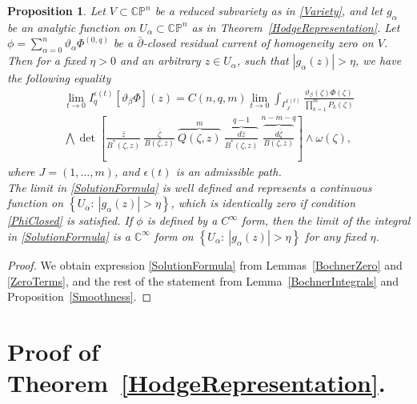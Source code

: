 \documentclass[11pt,reqno]{amsart}
\numberwithin{equation}{section}
\newtheorem{proposition}{Proposition}[section]
\begin{document}
\begin{proposition}\label{Solution} Let $V\subset {{\mathbb C}}{{\mathbb P}}^n$ be a reduced
subvariety as in \eqref{Variety}, and let $g_{\alpha}$ be an analytic function on
$U_{\alpha}\subset {{\mathbb C}}{{\mathbb P}}^n$ as in Theorem~\ref{HodgeRepresentation}. Let
$\phi=\sum_{\alpha=0}^n\vartheta_{\alpha}\Phi^{(0,q)}$
be a $\bar\partial$-closed residual current of homogeneity zero on $V$.\\
\indent
Then for a fixed $\eta>0$ and an arbitrary $z\in U_{\alpha}$,
such that $|g_{\alpha}(z)|>\eta$, we have the following equality
\begin{multline}\label{SolutionFormula}
\lim_{t\to 0}I_q^{\epsilon(t)}\left[\vartheta_{\beta}\Phi\right](z)
=C(n,q,m)\lim_{t\to 0}\int_{\Gamma^{\epsilon(t)}_J}
\frac{\vartheta_{\beta}(\zeta)\Phi(\zeta)}{\prod_{k=1}^mP_k(\zeta)}\\
\bigwedge\det\left[\frac{\bar z}{B^*(\zeta,z)}\ \frac{\bar\zeta}{B(\zeta,z)}\
\overbrace{Q(\zeta,z)}^{m}\
\overbrace{\frac{d{\bar z}}{B^*(\zeta,z)}}^{q-1}\
\overbrace{\frac{d{\bar\zeta}}{B(\zeta,z)}}^{n-m-q}\right]\wedge\omega(\zeta),
\end{multline}
where $J=(1,\dots,m)$, and $\epsilon(t)$ is an admissible path.\\
\indent
The limit in \eqref{SolutionFormula} is well defined and represents a continuous function
on $\left\{U_{\alpha}:\ |g_{\alpha}(z)|>\eta \right\}$, which is identically zero
if condition \eqref{PhiClosed} is satisfied. If $\phi$ is defined by a $C^{\infty}$ form,
then the limit of the integral in \eqref{SolutionFormula} is a ${{\mathbb C}}^{\infty}$ form
on $\left\{U_{\alpha}:\ |g_{\alpha}(z)|>\eta \right\}$ for any fixed $\eta$.
\end{proposition}
\begin{proof} We obtain expression \eqref{SolutionFormula} from Lemmas~\ref{BochnerZero}
and \ref{ZeroTerms}, and the rest of the statement from Lemma~\ref{BochnerIntegrals}
and Proposition~\ref{Smoothness}.
\end{proof}

\section{Proof of Theorem~\ref{HodgeRepresentation}.}\label{Proof}
\end{document}
